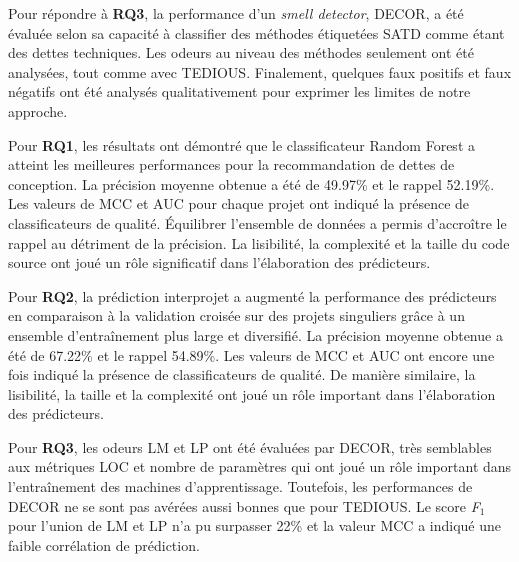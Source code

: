 Pour r\'{e}pondre \`{a} \textbf{RQ3}, la performance d'un \emph{smell detector}, \ac{DECOR}, a \'{e}t\'{e} \'{e}valu\'{e}e selon sa capacit\'{e} \`{a} classifier des m\'{e}thodes \'{e}tiquet\'{e}es \ac{SATD} comme \'{e}tant des dettes techniques. Les odeurs au niveau des m\'{e}thodes seulement ont \'{e}t\'{e} analys\'{e}es, tout comme avec \ac{TEDIOUS}. Finalement, quelques faux positifs et faux n\'{e}gatifs ont \'{e}t\'{e} analys\'{e}s qualitativement pour exprimer les limites de notre approche. \par

Pour \textbf{RQ1}, les r\'{e}sultats ont d\'{e}montr\'{e} que le classificateur Random Forest a atteint les meilleures performances pour la recommandation de dettes de conception. La pr\'{e}cision moyenne obtenue a \'{e}t\'{e} de 49.97\% et le rappel 52.19\%. Les valeurs de \ac{MCC} et \ac{AUC} pour chaque projet ont indiqu\'{e} la pr\'{e}sence de classificateurs de qualit\'{e}. \'{E}quilibrer l'ensemble de donn\'{e}es a permis d'accro\^{i}tre le rappel au d\'{e}triment de la pr\'{e}cision. La lisibilit\'{e}, la complexit\'{e} et la taille du code source ont jou\'{e} un r\^{o}le significatif dans l'\'{e}laboration des pr\'{e}dicteurs. \par

Pour \textbf{RQ2}, la pr\'{e}diction interprojet a augment\'{e} la performance des pr\'{e}dicteurs en comparaison \`{a} la validation crois\'{e}e sur des projets singuliers gr\^{a}ce \`{a} un ensemble d'entra\^{i}nement plus large et diversifi\'{e}. La pr\'{e}cision moyenne obtenue a \'{e}t\'{e} de 67.22\% et le rappel 54.89\%. Les valeurs de \ac{MCC} et \ac{AUC} ont encore une fois indiqu\'{e} la pr\'{e}sence de classificateurs de qualit\'{e}. De mani\`{e}re similaire, la lisibilit\'{e}, la taille et la complexit\'{e} ont jou\'{e} un r\^{o}le important dans l'\'{e}laboration des pr\'{e}dicteurs. \par

Pour \textbf{RQ3}, les odeurs \ac{LM} et \ac{LP} ont \'{e}t\'{e} \'{e}valu\'{e}es par \ac{DECOR}, tr\`{e}s semblables aux m\'{e}triques \ac{LOC} et nombre de param\`{e}tres qui ont jou\'{e} un r\^{o}le important dans l'entra\^{i}nement des machines d'apprentissage. Toutefois, les performances de \ac{DECOR} ne se sont pas av\'{e}r\'{e}es aussi bonnes que pour \ac{TEDIOUS}. Le score \emph{F$_{1}$} pour l'union de \ac{LM} et \ac{LP} n'a pu surpasser 22\% et la valeur \ac{MCC} a indiqu\'{e} une faible corr\'{e}lation de pr\'{e}diction. \par

